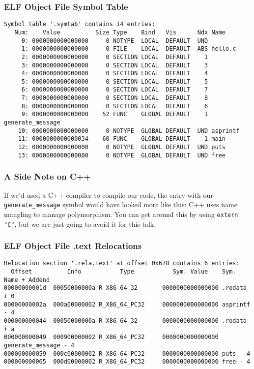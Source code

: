 \documentclass{beamer}
\begin{document}
\begin{frame}[fragile]
    \frametitle{ELF Object File Symbol Table}
    \begin{tiny}
     \begin{verbatim}
Symbol table '.symtab' contains 14 entries:
   Num:    Value          Size Type    Bind   Vis      Ndx Name
     0: 0000000000000000     0 NOTYPE  LOCAL  DEFAULT  UND
     1: 0000000000000000     0 FILE    LOCAL  DEFAULT  ABS hello.c
     2: 0000000000000000     0 SECTION LOCAL  DEFAULT    1
     3: 0000000000000000     0 SECTION LOCAL  DEFAULT    3
     4: 0000000000000000     0 SECTION LOCAL  DEFAULT    4
     5: 0000000000000000     0 SECTION LOCAL  DEFAULT    5
     6: 0000000000000000     0 SECTION LOCAL  DEFAULT    7
     7: 0000000000000000     0 SECTION LOCAL  DEFAULT    8
     8: 0000000000000000     0 SECTION LOCAL  DEFAULT    6
     9: 0000000000000000    52 FUNC    GLOBAL DEFAULT    1 generate_message
    10: 0000000000000000     0 NOTYPE  GLOBAL DEFAULT  UND asprintf
    11: 0000000000000034    60 FUNC    GLOBAL DEFAULT    1 main
    12: 0000000000000000     0 NOTYPE  GLOBAL DEFAULT  UND puts
    13: 0000000000000000     0 NOTYPE  GLOBAL DEFAULT  UND free
    \end{verbatim}
    \end{tiny}
\end{frame}

\begin{frame}[fragile]
    \frametitle{A Side Note on C++}
    If we'd used a C++ compiler to compile our code, the entry with our
    {\tt generate\_message} symbol would have looked more like this:
    C++ uses name mangling to manage polymorphism.  You can get around this by
    using {\tt extern "C"}, but we are just going to avoid it for this talk.
\end{frame}

\begin{frame}[fragile]
    \frametitle{ELF Object File .text Relocations}
    \begin{tiny}
        \begin{verbatim}
Relocation section '.rela.text' at offset 0x678 contains 6 entries:
  Offset          Info           Type           Sym. Value    Sym. Name + Addend
00000000001d  00050000000a R_X86_64_32       0000000000000000 .rodata + 0
00000000002a  000a00000002 R_X86_64_PC32     0000000000000000 asprintf - 4
000000000044  00050000000a R_X86_64_32       0000000000000000 .rodata + a
000000000049  000900000002 R_X86_64_PC32     0000000000000000 generate_message - 4
000000000059  000c00000002 R_X86_64_PC32     0000000000000000 puts - 4
000000000065  000d00000002 R_X86_64_PC32     0000000000000000 free - 4
        \end{verbatim}
    \end{tiny}
\end{frame}
\end{document}

